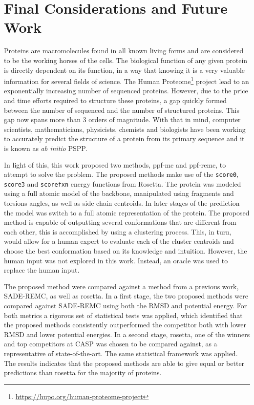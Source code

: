 \chapter{Final Considerations and Future Work}
\label{chap:final_considerations}

Proteins are macromolecules found in all known living forms and are
considered to be the working horses of the cells. The biological
function of any given protein is directly dependent on its
function, in a way that knowing it is a very valuable information
for several fields of science. The
Human Proteome\footnote{\url{https://hupo.org/human-proteome-project}} project
lead to an exponentially increasing number of sequenced proteins.
However, due to the price and time efforts required to structure
these proteins, a gap quickly formed between the number of sequenced
and the number of structured proteins. This gap now spans more than 3 orders
of magnitude. With that in mind, computer scientists, mathematicians,
physicists, chemists and biologists have been working to accurately
predict the structure of a protein from its primary
sequence and it is known as \textit{ab initio} PSPP.

In light of this, this work proposed two methods, ppf-mc and
ppf-remc, to attempt to solve the problem. The proposed methods make use of the \texttt{score0}, \texttt{score3} and \texttt{scorefxn} energy functions
from Rosetta. The protein was modeled using a full atomic model of the backbone,
manipulated using fragments and torsions angles, as well as side chain centroids.
In later stages of the prediction the model was switch to a full atomic
representation of the protein. The proposed method is capable of outputting
several conformations that are different from each other, this is accomplished
by using a clustering process. This, in turn, would allow for a human expert to
evaluate each of the cluster centroids and choose the best conformation based
on its knowledge and intuition. However, the human input was not explored in this
work. Instead, an oracle was used to replace the human input.

The proposed method were compared against a method from a previous work, SADE-REMC, as
well as rosetta. In a first stage, the two proposed methods were compared
against SADE-REMC using both the RMSD and potential energy.
For both metrics a rigorous set of statistical tests was applied, which identified that
the proposed methods consistently outperformed the competitor both with lower
RMSD and lower potential energies. In a second stage, rosetta, one of the
winners and top competitors at CASP was chosen to be compared against, as a
representative of state-of-the-art. The same statistical framework was applied.
The results indicates that the proposed methods are able to give equal or better
predictions than rosetta for the majority of proteins.

